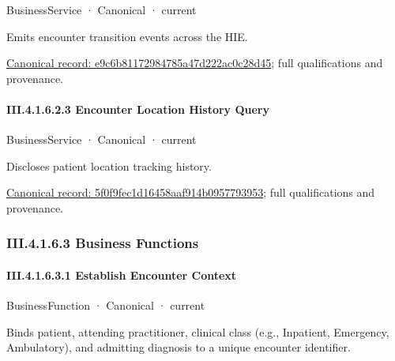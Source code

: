 \label{element:e9c6b81172984785a47d222ac0c28d45}
{\small BusinessService · Canonical · current}\par

Emits encounter transition events across the HIE.


{\footnotesize \href{../../../../continuum/business/business-service/e9c6b81172984785a47d222ac0c28d45.md}{Canonical record: e9c6b81172984785a47d222ac0c28d45}; full qualifications and provenance.}\par
\paragraph*{III.4.1.6.2.3 Encounter Location History Query}
\label{navigation:III.4.1.6.2.3}

\label{element:5f0f9fec1d16458aaf914b0957793953}
{\small BusinessService · Canonical · current}\par

Discloses patient location tracking history.


{\footnotesize \href{../../../../continuum/business/business-service/5f0f9fec1d16458aaf914b0957793953.md}{Canonical record: 5f0f9fec1d16458aaf914b0957793953}; full qualifications and provenance.}\par
\subsubsection*{III.4.1.6.3 Business Functions}
\label{navigation:III.4.1.6.3}

\paragraph*{III.4.1.6.3.1 Establish Encounter Context}
\label{navigation:III.4.1.6.3.1}

\label{element:df00c187d509483a8408304a066abec4}
{\small BusinessFunction · Canonical · current}\par

Binds patient, attending practitioner, clinical class (e.g., Inpatient, Emergency, Ambulatory), and admitting diagnosis to a unique encounter identifier.


